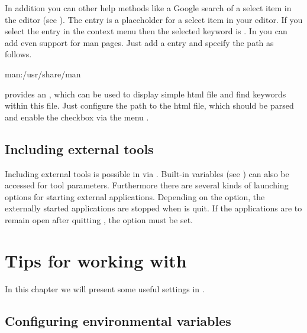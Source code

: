 In addition you can other help methods like a Google search of a select item in the \codeblocks editor (see ). The entry  is a placeholder for a select item in your editor. If you select the entry  in the context menu then the selected keyword is . In \codeblocks you can add even support for man pages. Just add a entry  and specify the path as follows.

\begin{cmd}
man:/usr/share/man
\end{cmd}

\codeblocks provides an , which can be used to display simple html file and find keywords within this file. Just configure the path to the html file, which should be parsed and enable the checkbox  via the menu .

%

\subsection{Including external tools}

Including external tools is possible in \codeblocks via . Built-in variables (see ) can also be accessed for tool parameters. Furthermore there are several kinds of launching options for starting external applications. Depending on the option, the externally started applications are stopped when \codeblocks is quit. If the applications are to remain open after quitting \codeblocks, the option  must be set.

\section{Tips for working with \codeblocks}

In this chapter we will present some useful settings in \codeblocks.

\subsection{Configuring environmental variables}

